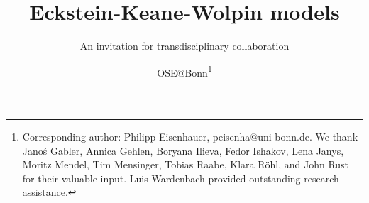 
\title{Eckstein-Keane-Wolpin models}
\subtitle{An invitation for transdisciplinary collaboration}
\author{OSE@Bonn\thanks{Corresponding author: Philipp Eisenhauer, peisenha@uni-bonn.de. We thank  Jano\'s Gabler, Annica Gehlen, Boryana Ilieva, Fedor Ishakov, Lena Janys, Moritz Mendel, Tim Mensinger, Tobias Raabe, Klara R\"ohl, and John Rust for their valuable input. Luis Wardenbach provided outstanding research assistance.}}
\date{}
